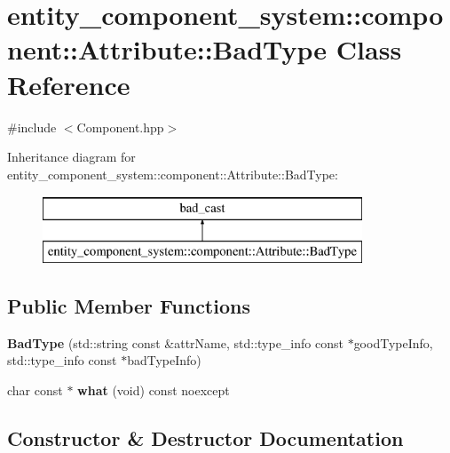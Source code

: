 \section{entity\+\_\+component\+\_\+system\+:\+:component\+:\+:Attribute\+:\+:Bad\+Type Class Reference}
\label{classentity__component__system_1_1component_1_1_attribute_1_1_bad_type}


{\ttfamily \#include $<$Component.\+hpp$>$}

Inheritance diagram for entity\+\_\+component\+\_\+system\+:\+:component\+:\+:Attribute\+:\+:Bad\+Type\+:\begin{figure}[H]
\begin{center}
\leavevmode
\includegraphics[height=2.000000cm]{d9/d44/classentity__component__system_1_1component_1_1_attribute_1_1_bad_type}
\end{center}
\end{figure}
\subsection*{Public Member Functions}
\begin{DoxyCompactItemize}
\item 
{\bf Bad\+Type} (std\+::string const \&attr\+Name, std\+::type\+\_\+info const $\ast$good\+Type\+Info, std\+::type\+\_\+info const $\ast$bad\+Type\+Info)
\item 
char const  $\ast$ {\bf what} (void) const noexcept
\end{DoxyCompactItemize}


\subsection{Constructor \& Destructor Documentation}
\label{classentity__component__system_1_1component_1_1_attribute_1_1_bad_type_a192b4163ab64e321416127e442a54aa0} 
